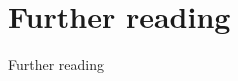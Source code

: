 \documentclass[aspectratio=169]{beamer}
\begin{document}
\section{Further reading}
\begin{frame}{Further reading}
  \nocite{*}
  \printbibliography[heading=none]
\end{frame}
\end{document}
